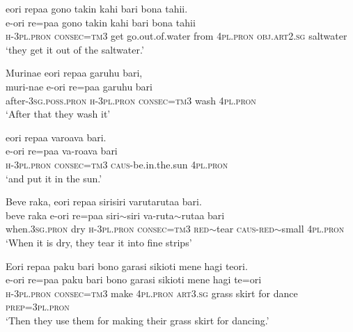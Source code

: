 \ea\label{ex:text8-13}
eori repaa gono takin kahi bari bona tahii.\\
\gll e-ori	re=paa	gono	takin	kahi	bari	bona	tahii\\
     \textsc{h}-3\textsc{pl}.\textsc{pron}	\textsc{consec}=\textsc{tm}3	get	go.out.of.water	from	4\textsc{pl}.\textsc{pron}	\textsc{obj}.\textsc{art}2.\textsc{sg}	saltwater\\
\glt `they get it out of the saltwater.'
\z

\ea\label{ex:text8-14}
Murinae eori repaa garuhu bari,\\
\gll muri-nae	e-ori	re=paa	garuhu	bari\\
     after-3\textsc{sg}.\textsc{poss}.\textsc{pron}	\textsc{h}-3\textsc{pl}.\textsc{pron}	\textsc{consec}=\textsc{tm}3	wash	4\textsc{pl}.\textsc{pron}\\
\glt `After that they wash it'
\z

\ea\label{ex:text8-15}
eori repaa varoava bari.\\
\gll e-ori	re=paa	va-roava	bari\\
     \textsc{h}-3\textsc{pl}.\textsc{pron}	\textsc{consec}=\textsc{tm}3	\textsc{caus}-be.in.the.sun	4\textsc{pl}.\textsc{pron}\\
\glt `and put it in the sun.'
\z

\ea\label{ex:text8-16}
Beve raka, eori repaa sirisiri varutarutaa bari.\\
\gll beve	raka	e-ori	re=paa	siri{$\sim$}siri	va-ruta{$\sim$}rutaa	bari\\
     when.3\textsc{sg}.\textsc{pron}	dry	\textsc{h}-3\textsc{pl}.\textsc{pron}	\textsc{consec}=\textsc{tm}3	\textsc{red}{$\sim$}tear	\textsc{caus}-\textsc{red}{$\sim$}small	4\textsc{pl}.\textsc{pron}\\
\glt `When it is dry, they tear it into fine strips'
\z

\ea\label{ex:text8-17}
Eori repaa paku bari bono garasi sikioti mene hagi teori.\\
\gll e-ori	re=paa	paku	bari	bono	garasi	sikioti	mene	hagi	te=ori\\
     \textsc{h}-3\textsc{pl}.\textsc{pron}	\textsc{consec}=\textsc{tm}3	make	4\textsc{pl}.\textsc{pron}	\textsc{art}3.\textsc{sg}	grass	skirt	for	dance	\textsc{prep}=3\textsc{pl}.\textsc{pron}\\
\glt `Then they use them for making their grass skirt for dancing.'
\z